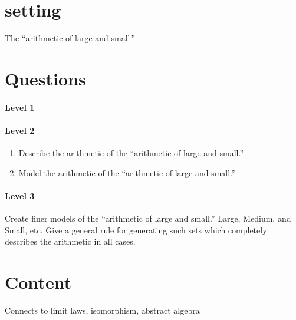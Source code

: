 \documentclass{ximera}
\begin{document}
\section{setting}

The ``arithmetic of large and small.''


\section{Questions}

\paragraph{Level 1}

\paragraph{Level 2}

\begin{enumerate}
\item Describe the arithmetic of the ``arithmetic of large and small.''
\item Model the arithmetic of the ``arithmetic of large and small.''
\end{enumerate}

\paragraph{Level 3}
\item Create finer models of the ``arithmetic of large and small.''
  Large, Medium, and Small, etc. Give a general rule for generating
  such sets which completely describes the arithmetic in all cases. 


  \section{Content}

  Connects to limit laws, isomorphism, abstract algebra
\end{document}
